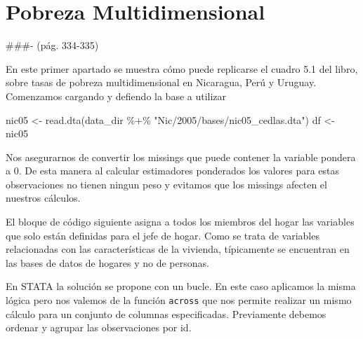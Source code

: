 \documentclass[
]{book}
\newenvironment{Shaded}{\begin{snugshade}}{\end{snugshade}}
\newcommand{\DecValTok}[1]{\textcolor[rgb]{0.00,0.00,0.81}{#1}}
\newcommand{\FunctionTok}[1]{\textcolor[rgb]{0.00,0.00,0.00}{#1}}
\newcommand{\NormalTok}[1]{#1}
\newcommand{\OtherTok}[1]{\textcolor[rgb]{0.56,0.35,0.01}{#1}}
\newcommand{\SpecialCharTok}[1]{\textcolor[rgb]{0.00,0.00,0.00}{#1}}
\newcommand{\StringTok}[1]{\textcolor[rgb]{0.31,0.60,0.02}{#1}}
\begin{document}
\hypertarget{pobreza-multidimensional}{%
\section{Pobreza Multidimensional}\label{pobreza-multidimensional}}

\#\#\#- (pág. 334-335)

En este primer apartado se muestra cómo puede replicarse el cuadro 5.1 del libro, sobre tasas de pobreza multidimensional en Nicaragua, Perú y Uruguay. Comenzamos cargando y defiendo la base a utilizar

\begin{Shaded}
\begin{Highlighting}[]
\NormalTok{nic05 }\OtherTok{\textless{}{-}} \FunctionTok{read.dta}\NormalTok{(data\_dir }\SpecialCharTok{\%+\%} \StringTok{"Nic/2005/bases/nic05\_cedlas.dta"}\NormalTok{)      }
\NormalTok{df }\OtherTok{\textless{}{-}}\NormalTok{ nic05}
\end{Highlighting}
\end{Shaded}

Nos asegurarnos de convertir los missings que puede contener la variable pondera a 0. De esta manera al calcular estimadores ponderados los valores para estas observaciones no tienen ningun peso y evitamos que los missings afecten el nuestros cálculos.

\begin{Shaded}
\end{Shaded}

El bloque de código siguiente asigna a todos los miembros del hogar las variables que solo están definidas para el jefe de hogar. Como se trata de variables relacionadas con las características de la vivienda, típicamente se encuentran
en las bases de datos de hogares y no de personas.

En STATA la solución se propone con un bucle. En este caso aplicamos la misma lógica pero nos valemos de la función \texttt{across} que nos permite realizar un mismo cálculo para un conjunto de columnas especificadas. Previamente debemos ordenar y agrupar las observaciones por id.
\end{document}
